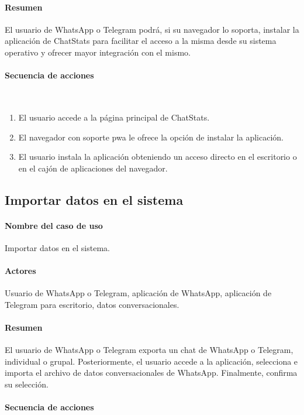 \paragraph{Resumen} El usuario de WhatsApp o Telegram podrá, si su navegador lo soporta, instalar la aplicación de ChatStats para facilitar el acceso a la misma desde su sistema operativo y ofrecer mayor integración con el mismo.
\paragraph{Secuencia de acciones}\mbox{}\\

\begin{enumerate}
	\item El usuario accede a la página principal de ChatStats.
	\item El navegador con soporte \acrshort{pwa} le ofrece la opción de instalar la aplicación.
	\item El usuario instala la aplicación obteniendo un acceso directo en el escritorio o en el cajón de aplicaciones del navegador.
\end{enumerate}

\subsection{Importar datos en el sistema}

\paragraph{Nombre del caso de uso} Importar datos en el sistema.
\paragraph{Actores} Usuario de WhatsApp o Telegram, aplicación de WhatsApp, aplicación de Telegram para escritorio, datos conversacionales.
\paragraph{Resumen} El usuario de WhatsApp o Telegram exporta un chat de WhatsApp o Telegram, individual o grupal. Posteriormente, el usuario accede a la aplicación, selecciona e importa el archivo de datos conversacionales de WhatsApp. Finalmente, confirma su selección.
\paragraph{Secuencia de acciones}\mbox{}\\

